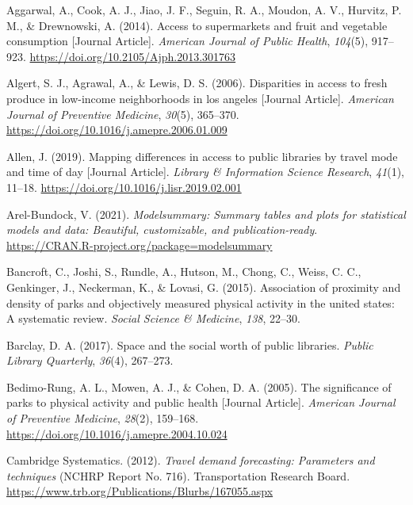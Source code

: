 \documentclass[review, 3p]{elsarticle} %
\newlength{\cslhangindent}
\newlength{\cslentryspacingunit} %
\newenvironment{CSLReferences}[2] %
 {%
  \setlength{\parindent}{0pt}
  \ifodd #1
  \let\oldpar\par
  \def\par{\hangindent=\cslhangindent\oldpar}
  \fi
  \setlength{\parskip}{#2\cslentryspacingunit}
 }%
 {}
\begin{document}
\hypertarget{refs}{}
\begin{CSLReferences}{1}{0}
\leavevmode{}%
Aggarwal, A., Cook, A. J., Jiao, J. F., Seguin, R. A., Moudon, A. V., Hurvitz, P. M., \& Drewnowski, A. (2014). Access to supermarkets and fruit and vegetable consumption {[}Journal Article{]}. \emph{American Journal of Public Health}, \emph{104}(5), 917--923. \url{https://doi.org/10.2105/Ajph.2013.301763}

\leavevmode{}%
Algert, S. J., Agrawal, A., \& Lewis, D. S. (2006). Disparities in access to fresh produce in low-income neighborhoods in los angeles {[}Journal Article{]}. \emph{American Journal of Preventive Medicine}, \emph{30}(5), 365--370. \url{https://doi.org/10.1016/j.amepre.2006.01.009}

\leavevmode{}%
Allen, J. (2019). Mapping differences in access to public libraries by travel mode and time of day {[}Journal Article{]}. \emph{Library \& Information Science Research}, \emph{41}(1), 11--18. \url{https://doi.org/10.1016/j.lisr.2019.02.001}

\leavevmode{}%
Arel-Bundock, V. (2021). \emph{Modelsummary: Summary tables and plots for statistical models and data: Beautiful, customizable, and publication-ready}. \url{https://CRAN.R-project.org/package=modelsummary}

\leavevmode{}%
Bancroft, C., Joshi, S., Rundle, A., Hutson, M., Chong, C., Weiss, C. C., Genkinger, J., Neckerman, K., \& Lovasi, G. (2015). Association of proximity and density of parks and objectively measured physical activity in the united states: A systematic review. \emph{Social Science \& Medicine}, \emph{138}, 22--30.

\leavevmode{}%
Barclay, D. A. (2017). Space and the social worth of public libraries. \emph{Public Library Quarterly}, \emph{36}(4), 267--273.

\leavevmode{}%
Bedimo-Rung, A. L., Mowen, A. J., \& Cohen, D. A. (2005). The significance of parks to physical activity and public health {[}Journal Article{]}. \emph{American Journal of Preventive Medicine}, \emph{28}(2), 159--168. \url{https://doi.org/10.1016/j.amepre.2004.10.024}

\leavevmode{}%
Cambridge Systematics. (2012). \emph{Travel demand forecasting: Parameters and techniques} (NCHRP Report No. 716). Transportation Research Board. \url{https://www.trb.org/Publications/Blurbs/167055.aspx}


\end{CSLReferences}
\end{document}
